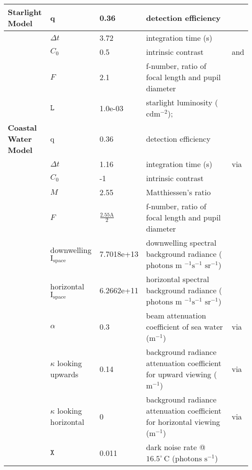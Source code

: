 \begin{tabular}{|L{3.5cm}|L{2cm}|L{2cm}|L{4.5cm}|L{4.5cm}|}
\textbf{Starlight Model}&q&0.36&detection efficiency&\cite{Nils14a}\\\hline
 &$\Delta t$&3.72&integration time (s)&\cite{Donn95a}\\\hline
 &$C_{0}$&0.5&intrinsic contrast&\cite{Hest68a} and \cite{Blac46a}\\\hline
 &$F$&2.1&f-number, ratio of focal length and pupil diameter&\cite{Mill79a}\\\hline
 &$\mathtt{L}$&1.0e-03&starlight luminosity ($\text{cd} \text{m}^{-2}$);&\cite{Midd52a}\\\hline
\textbf{Coastal Water Model}&q&0.36&detection efficiency&\cite{Nils14a}\\\hline
 &$\Delta t$&1.16&integration time (s)&\cite{Donn95a} via \cite{Nils14a}\\\hline
 &$C_{0}$&-1&intrinsic contrast&\cite{Nils14a}\\\hline
 &$M$&2.55&Matthiessen's ratio&\cite{Nils14a}\\\hline
 &$F$&$\frac{2.55\text{A}}{2}$&f-number, ratio of focal length and pupil diameter&\cite{Nils14a}\\\hline
 &downwelling $\text{I}_{\text{space}}$&7.7018e+13&downwelling spectral background radiance ($\text{photons } \text{m }^{-1} \text{s}^{-1} \text{ sr}^{-1}$)&\cite{Nils14a}\\\hline
 &horizontal $\text{I}_{\text{space}}$&6.2662e+11&horizontal spectral background radiance ($\text{photons } \text{m }^{-1} \text{s}^{-1} \text{ sr}^{-1}$)&\cite{Nils14a}\\\hline
 &$\alpha$&0.3&beam attenuation coefficient of sea water ($\text{m}^{-1}$)&\cite{John02a} via \cite{Nils14a}\\\hline
 &$\kappa$ looking upwards&0.14&background radiance attenuation coefficient for upward viewing ($\text{m}^{-1}$)&\cite{John02a} via \cite{Nils14a}\\\hline
 &$\kappa$ looking horizontal&0&background radiance attenuation coefficient for horizontal viewing ($\text{m}^{-1}$)&\cite{John02a} via \cite{Nils14a}\\\hline
 &$\mathtt{X}$&0.011&dark noise rate @$16.5^{\circ} \, \text{C}$ ($\text{photons } \text{s}^{-1}$)&\cite{Aho93a}\\\hline
\end{tabular}
